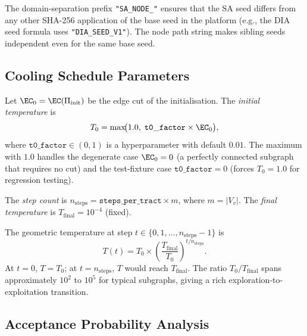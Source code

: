 The domain-separation prefix \texttt{"SA\_NODE\_"} ensures that the SA seed
differs from any other SHA-256 application of the base seed in the platform
(e.g., the DIA seed formula uses \texttt{"DIA\_SEED\_V1"}).
The node path string makes sibling seeds independent even for the same base
seed.

\subsection{Cooling Schedule Parameters}

\begin{definition}
\label{def:t0}
Let $\EC_0 = \EC(\Pi_{\mathrm{init}})$ be the edge cut of the \metis{}
initialisation.
The \emph{initial temperature} is
\[
  T_0 = \max\!\bigl(1.0,\; \mathtt{t0\_factor} \times \EC_0\bigr),
\]
where $\mathtt{t0\_factor} \in (0,1)$ is a hyperparameter with default $0.01$.
The maximum with $1.0$ handles the degenerate case $\EC_0 = 0$
(a perfectly connected subgraph that requires no cut) and the test-fixture
case $\mathtt{t0\_factor} = 0$ (forces $T_0 = 1.0$ for regression testing).
\end{definition}

\begin{definition}
\label{def:steps}
The \emph{step count} is $n_{\mathrm{steps}} = \mathtt{steps\_per\_tract} \times m$,
where $m = |V_v|$.
The \emph{final temperature} is $T_{\mathrm{final}} = 10^{-4}$ (fixed).
\end{definition}

The geometric temperature at step $t \in \{0, 1, \ldots, n_{\mathrm{steps}}-1\}$ is
\[
  T(t) = T_0 \times \left(\frac{T_{\mathrm{final}}}{T_0}\right)^{t / n_{\mathrm{steps}}}.
\]
At $t = 0$, $T = T_0$; at $t = n_{\mathrm{steps}}$, $T$ would reach $T_{\mathrm{final}}$.
The ratio $T_0 / T_{\mathrm{final}}$ spans approximately $10^2$ to $10^5$ for
typical subgraphs, giving a rich exploration-to-exploitation transition.

\subsection{Acceptance Probability Analysis}

